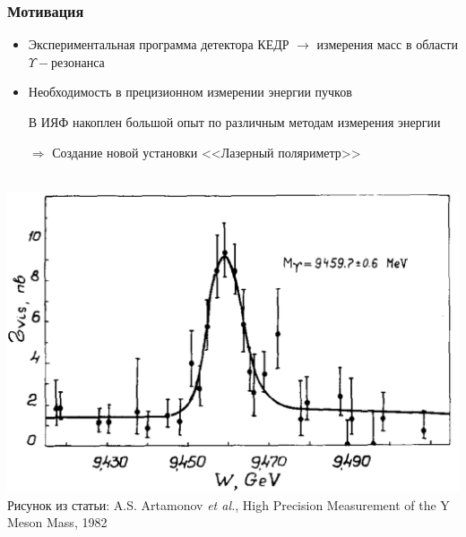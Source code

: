 \documentclass[12pt,aspectratio=169]{beamer}
\begin{document}
\begin{frame}
	\frametitle{Мотивация}
	\begin{minipage}[h]{0.55\linewidth}
			\begin{itemize}
				\itemsep=0.7em
				\item Экспериментальная программа детектора КЕДР $\rightarrow$ измерения масс в области $\Upsilon-\text{резонанса}$
				\onslide<2-> \item Необходимость в прецизионном измерении энергии пучков
				\onslide<3-> \item [\textcolor{calmGreen}{\checkmark}] В ИЯФ накоплен большой опыт по различным методам измерения энергии
				\onslide<4>\item [$\Rightarrow$] Создание новой установки <<Лазерный поляриметр>>
		\end{itemize}
		\hfill
	\end{minipage}
	\begin{minipage}[h]{0.43\linewidth}
		\ \includegraphics[width=1\linewidth]{UpsilonMass.png}
		\\\tiny{Рисунок из статьи: A.S. Artamonov \emph{et al.}, High Precision Measurement of the Y Meson Mass, 1982}
	\end{minipage}
\end{frame}
\end{document}
